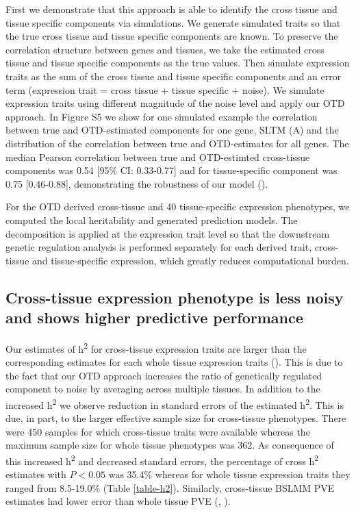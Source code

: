 \documentclass[10pt,letterpaper]{article}
\begin{document}
First we demonstrate that this approach is able to identify the cross tissue and tissue specific components via simulations. We generate simulated traits so that the true cross tissue and tissue specific components are known. To preserve the correlation structure between genes and tissues, we take the estimated cross tissue and tissue specific components as the true values. Then simulate expression traits as the sum of the cross tissue and tissue specific components and an error term (expression trait = cross tissue + tissue specific + noise). We simulate expression traits using different magnitude of the noise level and apply our OTD approach. 
In Figure S5 we show for one simulated example the correlation between true and OTD-estimated components for one gene, SLTM (A) and the distribution of the correlation between true and OTD-estimates for all genes. The median Pearson correlation between true and OTD-estimted cross-tissue components was 0.54 [95\% CI: 0.33-0.77] and for tissue-specific component was 0.75 [0.46-0.88], demonstrating the robustness of our model (). 

For the OTD derived cross-tissue and 40 tissue-specific expression phenotypes, we computed the local heritability and generated prediction models.
The decomposition is applied at the expression trait level so that the downstream genetic regulation analysis is performed separately for each derived trait, cross-tissue and tissue-specific expression, which greatly reduces computational burden. 

\subsection*{Cross-tissue expression phenotype is less noisy and shows higher predictive performance}%

Our estimates of h\textsuperscript{2} for cross-tissue expression traits are larger than the corresponding estimates for each whole tissue expression traits ().
This is due to the fact that our OTD approach increases the ratio of genetically regulated component to noise by averaging across multiple tissues. In addition to the increased h\textsuperscript{2} we observe reduction in standard errors of the estimated h\textsuperscript{2}. This is due, in part, to the larger effective sample size for cross-tissue phenotypes. There were 450 samples for which cross-tissue traits were available whereas the maximum sample size for whole tissue phenotypes was 362. As consequence of this increased h\textsuperscript{2} and decreased standard errors, the percentage of cross h\textsuperscript{2} estimates with $P < 0.05$ was 35.4\% whereas for whole tissue expression traits they ranged from 8.5-19.0\% (Table \ref{table-h2}). Similarly, cross-tissue BSLMM PVE estimates had lower error than whole tissue PVE (, ). 
\end{document}
